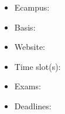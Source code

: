 \begin{tcolorbox}[enhanced,breakable,
	title=General Information,frame style={color=mycolor}]
    \begin{itemize}
        \item Ecampus: \href{}{}
        \item Basis: \href{}{}
        \item Website: \href{}{}
        \item Time slot(s): 
        \item Exams: 
        \item Deadlines:
    \end{itemize}
\end{tcolorbox}